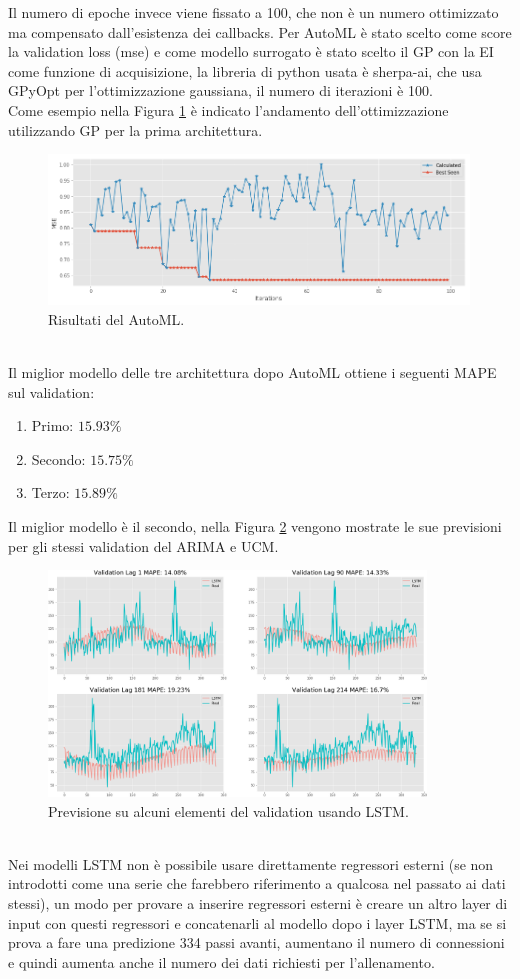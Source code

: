 \documentclass[12pt, onecolumn]{article}
\begin{document}
Il numero di epoche invece viene fissato a 100, che non è un numero ottimizzato ma compensato dall'esistenza dei callbacks.
Per AutoML è stato scelto come score la validation loss (mse) e come modello surrogato è stato scelto il GP con la EI come funzione di acquisizione, la libreria di python usata è sherpa-ai, che usa GPyOpt per l'ottimizzazione gaussiana, il numero di iterazioni è 100.\\
Come esempio nella Figura \ref{fig:automl} è indicato l'andamento dell'ottimizzazione utilizzando GP per la prima architettura.
\begin{figure}[!h]
  \centering
  \includegraphics[width=\linewidth,height=4cm]{imgs/automl_1.png}
  \caption{Risultati del AutoML.}
  \label{fig:automl}
\end{figure}\\
Il miglior modello delle tre architettura dopo AutoML ottiene i seguenti MAPE sul validation:
\begin{enumerate}[noitemsep, topsep=0ex]
\item Primo: $15.93\%$
\item Secondo: $15.75\%$
\item Terzo: $15.89\%$
\end{enumerate}
Il miglior modello è il secondo, nella Figura \ref{fig:LSTM_pred} vengono mostrate le sue previsioni per gli stessi validation del ARIMA e UCM.
\begin{figure}[!h]
  \centering
  \includegraphics[width=\linewidth,height=6cm]{imgs/forecast_lstm.png}
  \caption{Previsione su alcuni elementi del validation usando LSTM.}
  \label{fig:LSTM_pred}
\end{figure}\\
Nei modelli LSTM non è possibile usare direttamente regressori esterni (se non introdotti come una serie che farebbero riferimento a qualcosa nel passato ai dati stessi), un modo per provare a inserire regressori esterni è creare un altro layer di input con questi regressori e concatenarli al modello dopo i layer LSTM, ma se si prova a fare una predizione 334 passi avanti, aumentano il numero di connessioni e quindi aumenta anche il numero dei dati richiesti per l'allenamento.
\end{document}
